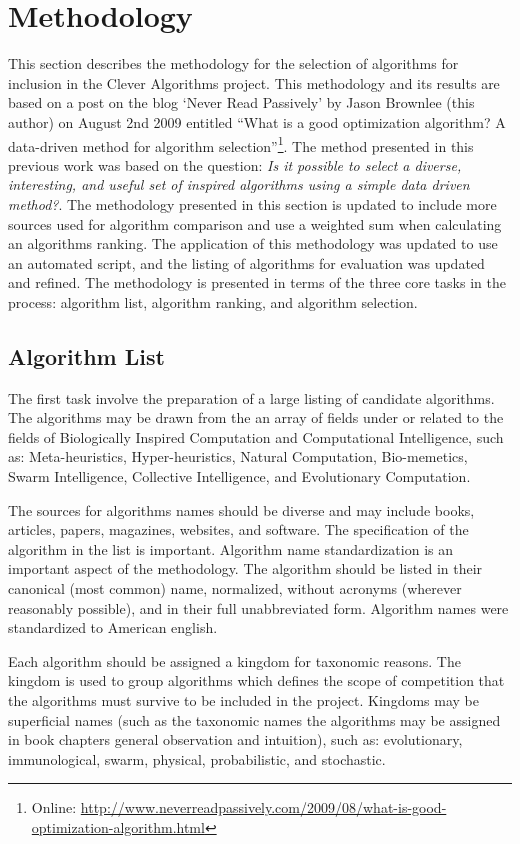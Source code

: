 \documentclass[a4paper, 11pt]{article}
\begin{document}
\section{Methodology}
\label{sec:methodology}
This section describes the methodology for the selection of algorithms for inclusion in the Clever Algorithms project. This methodology and its results are based on a post on the blog `Never Read Passively' by Jason Brownlee (this author) on August 2nd 2009 entitled ``What is a good optimization algorithm? A data-driven method for algorithm selection''\footnote{Online: \url{http://www.neverreadpassively.com/2009/08/what-is-good-optimization-algorithm.html}}. The method presented in this previous work was based on the question: \emph{Is it possible to select a diverse, interesting, and useful set of inspired algorithms using a simple data driven method?}. The methodology presented in this section is updated to include more sources used for algorithm comparison and use a weighted sum when calculating an algorithms ranking. The application of this methodology was updated to use an automated script, and the listing of algorithms for evaluation was updated and refined. The methodology is presented in terms of the three core tasks in the process: algorithm list, algorithm ranking, and algorithm selection.

% 
% 
\subsection{Algorithm List}
The first task involve the preparation of a large listing of candidate algorithms. The algorithms may be drawn from the an array of fields under or related to the fields of Biologically Inspired Computation and Computational Intelligence, such as: Meta-heuristics, Hyper-heuristics, Natural Computation, Bio-memetics, Swarm Intelligence, Collective Intelligence, and Evolutionary Computation.

The sources for algorithms names should be diverse and may include books, articles, papers, magazines, websites, and software. The specification of the algorithm in the list is important. Algorithm name standardization is an important aspect of the methodology. The algorithm should be listed in their canonical (most common) name, normalized, without acronyms (wherever reasonably possible), and in their full unabbreviated form. Algorithm names were standardized to American english.

Each algorithm should be assigned a kingdom for taxonomic reasons. The kingdom is used to group algorithms which defines the scope of competition that the algorithms must survive to be included in the project. Kingdoms may be superficial names (such as the taxonomic names the algorithms may be assigned in book chapters general observation and intuition), such as: evolutionary, immunological, swarm, physical, probabilistic, and stochastic.
\end{document}
